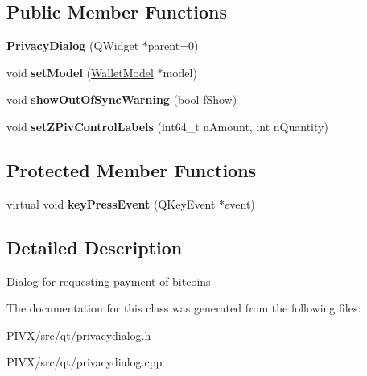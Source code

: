 \subsection*{Public Member Functions}
\begin{DoxyCompactItemize}
\item 
\mbox{\label{class_privacy_dialog_ab7308b7ed5782dfa26fb1f216385207c}} 
{\bfseries Privacy\+Dialog} (Q\+Widget $\ast$parent=0)
\item 
\mbox{\label{class_privacy_dialog_a7a2e2a84934e59ff1ff88de325036472}} 
void {\bfseries set\+Model} (\mbox{\hyperlink{class_wallet_model}{Wallet\+Model}} $\ast$model)
\item 
\mbox{\label{class_privacy_dialog_ace0f9c4b228a1d7915582884c7e403b0}} 
void {\bfseries show\+Out\+Of\+Sync\+Warning} (bool f\+Show)
\item 
\mbox{\label{class_privacy_dialog_a75f474a5be500e4da38104a2497a54d1}} 
void {\bfseries set\+Z\+Piv\+Control\+Labels} (int64\+\_\+t n\+Amount, int n\+Quantity)
\end{DoxyCompactItemize}
\subsection*{Protected Member Functions}
\begin{DoxyCompactItemize}
\item 
\mbox{\label{class_privacy_dialog_a4e014cfd8f1632ce00914b84e133cf64}} 
virtual void {\bfseries key\+Press\+Event} (Q\+Key\+Event $\ast$event)
\end{DoxyCompactItemize}


\subsection{Detailed Description}
Dialog for requesting payment of bitcoins 

The documentation for this class was generated from the following files\+:\begin{DoxyCompactItemize}
\item 
P\+I\+V\+X/src/qt/privacydialog.\+h\item 
P\+I\+V\+X/src/qt/privacydialog.\+cpp\end{DoxyCompactItemize}
